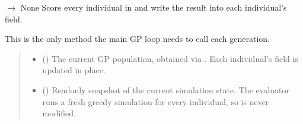 \documentclass[letterpaper,10pt,english]{sphinxmanual}
\begin{document}
\begin{fulllineitems}
\begin{fulllineitems}
\label{\detokenize{api:scheduler.FitnessEvaluator.evaluate}}
\pysigstartsignatures
\pysiglinewithargsret
{}
{\sphinxparamcomma {}\sphinxparamcomma {}}
{{ $\rightarrow$ None}}
\pysigstopsignatures
\sphinxAtStartPar
Score every individual in  and write the result into each
individual’s  field.

\sphinxAtStartPar
This is the only method the main GP loop needs to call each generation.
\begin{quote}\begin{description}
\begin{itemize}
\item {} 
\sphinxAtStartPar
{} (\sphinxstyleliteralemphasis{\sphinxupquote{{[}}}{\hyperref[\detokenize{api:scheduler.Individual}]{\sphinxcrossref{\sphinxstyleliteralemphasis{\sphinxupquote{Individual}}}}}\sphinxstyleliteralemphasis{\sphinxupquote{{]}}}) \textendash{} The current GP population, obtained via {\hyperref[\detokenize{api:scheduler.SchedulerGP.getPopulation}]{}}.
Each individual’s  field is updated in place.

\item {} 
\sphinxAtStartPar
{} ({\hyperref[\detokenize{api:scheduler.SimulationSnapshot}]{}}) \textendash{} Read\sphinxhyphen{}only snapshot of the current simulation state.  The evaluator
runs a fresh greedy simulation for every individual, so  is
never modified.

\end{itemize}


\end{description}
\end{quote}
\end{fulllineitems}
\end{fulllineitems}
\end{document}
